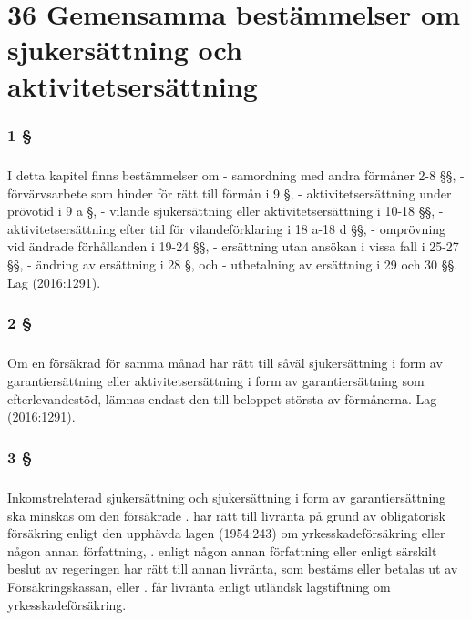\documentclass[a4paper,notitlepage,openany,10pt]{book}
\begin{document}
\chapter*{36 Gemensamma bestämmelser om sjukersättning och aktivitetsersättning}
\subsection*{1 §}
\paragraph*{}
I detta kapitel finns bestämmelser om
\newline - samordning med andra förmåner 2-8 §§,
\newline - förvärvsarbete som hinder för rätt till förmån i 9 §,
\newline - aktivitetsersättning under prövotid i 9 a §,
\newline - vilande sjukersättning eller aktivitetsersättning i 10-18 §§,
\newline - aktivitetsersättning efter tid för vilandeförklaring i 18 a-18 d §§,
\newline - omprövning vid ändrade förhållanden i 19-24 §§,
\newline - ersättning utan ansökan i vissa fall i 25-27 §§,
\newline - ändring av ersättning i 28 §, och
\newline - utbetalning av ersättning i 29 och 30 §§.
Lag (2016:1291).
\subsection*{2 §}
\paragraph*{}
Om en försäkrad för samma månad har rätt till såväl sjukersättning i form av garantiersättning eller aktivitetsersättning i form av garantiersättning som efterlevandestöd, lämnas endast den till beloppet största av förmånerna.
Lag (2016:1291).
\subsection*{3 §}
\paragraph*{}
Inkomstrelaterad sjukersättning och sjukersättning i form av garantiersättning ska minskas om den försäkrade
. har rätt till livränta på grund av obligatorisk försäkring enligt den upphävda lagen (1954:243) om yrkesskadeförsäkring eller någon annan författning,
. enligt någon annan författning eller enligt särskilt beslut av regeringen har rätt till annan livränta, som bestäms eller betalas ut av Försäkringskassan, eller
. får livränta enligt utländsk lagstiftning om yrkesskadeförsäkring.
\end{document}
